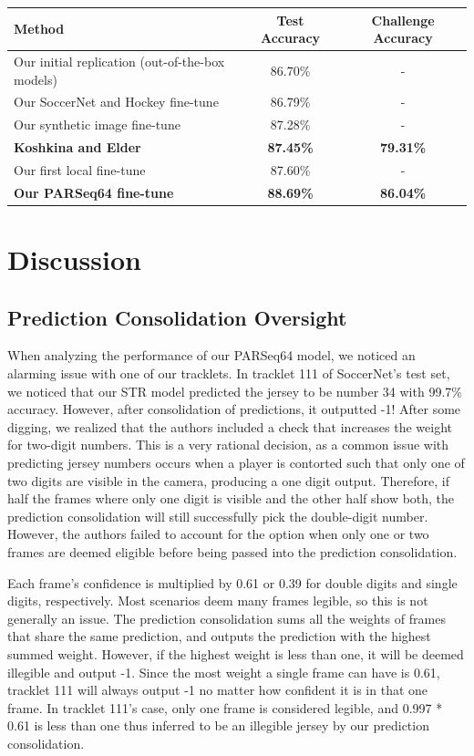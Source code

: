 \documentclass[11pt, letterpaper]{article}
\begin{document}
\begin{center}
  \begin{tabular}{|l|c|c|}
    \hline
    \textbf{Method} & \textbf{Test Accuracy} & \textbf{Challenge Accuracy} \\
    \hline
    Our initial replication (out-of-the-box models) & 86.70\% & - \\
    Our SoccerNet and Hockey fine-tune & 86.79\% & - \\
    Our synthetic image fine-tune & 87.28\% & - \\
    \textbf{Koshkina and Elder} & \textbf{87.45\%} & \textbf{79.31\%} \\
    Our first local fine-tune & 87.60\% & - \\
    \textbf{Our PARSeq64 fine-tune} & \textbf{88.69\%} & \textbf{86.04\%} \\
    \hline
    \end{tabular}
\end{center}

\section{Discussion}

\subsection{Prediction Consolidation Oversight}

When analyzing the performance of our PARSeq64 model, we noticed an alarming issue with one of our tracklets. In tracklet 111 of SoccerNet's test set, we noticed that our STR model predicted the jersey to be number 34 with 99.7\% accuracy. However, after consolidation of predictions, it outputted -1! After some digging, we realized that the authors included a check that increases the weight for two-digit numbers. This is a very rational decision, as a common issue with predicting jersey numbers occurs when a player is contorted such that only one of two digits are visible in the camera, producing a one digit output. Therefore, if half the frames where only one digit is visible and the other half show both, the prediction consolidation will still successfully pick the double-digit number. However, the authors failed to account for the option when only one or two frames are deemed eligible before being passed into the prediction consolidation.

Each frame's confidence is multiplied by 0.61 or 0.39 for double digits and single digits, respectively. Most scenarios deem many frames legible, so this is not generally an issue. The prediction consolidation sums all the weights of frames that share the same prediction, and outputs the prediction with the highest summed weight. However, if the highest weight is less than one, it will be deemed illegible and output -1. Since the most weight a single frame can have is 0.61, tracklet 111 will always output -1 no matter how confident it is in that one frame. In tracklet 111's case, only one frame is considered legible, and 0.997 * 0.61 is less than one thus inferred to be an illegible jersey by our prediction consolidation. 
\end{document}

